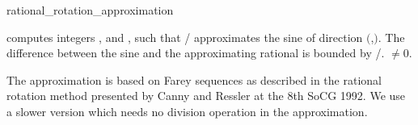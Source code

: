\begin{ccRefFunction}{rational_rotation_approximation}

{computes integers ,  and , such
that / approximates the sine of direction 
$($,$)$. The difference between the sine and
the approximating rational is bounded by /.
\ccPrecond {} $\neq 0$.}

\ccImplementation
The approximation is based on Farey sequences as described in
the rational rotation method presented by Canny and Ressler at the 
8th SoCG 1992. We use a slower version which needs no division operation 
in the approximation.

\ccSeeAlso
{}

\end{ccRefFunction}

